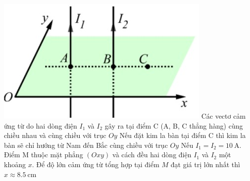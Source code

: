\begin{ex}
	{\vspace{-0.5cm}\includegraphics[scale=0.6]{../figs/FINAL-SEM1-004-9}}
	{Các vectơ cảm ứng từ do hai dòng điện $I_1$ và $I_2$ gây ra tại điểm C (A, B, C thẳng hàng) cùng chiều nhau và cùng chiều với trục $Oy$}
	{Nếu đặt kim la bàn tại điểm C thì kim la bàn sẽ chỉ hướng từ Nam đến Bắc cùng chiều với trục $Oy$}
	{Nếu $I_1=I_2=\SI{10}{\ampere}$. Điểm M thuộc mặt phẳng $\left(Oxy\right)$ và cách đều hai dòng điện $I_1$ và $I_2$ một khoảng $x$. Để độ lớn cảm ứng từ tổng hợp tại điểm $M$ đạt giá trị lớn nhất thì $x \approx \SI{8.5}{\centi\meter}$}
	\loigiai{}
\end{ex}
